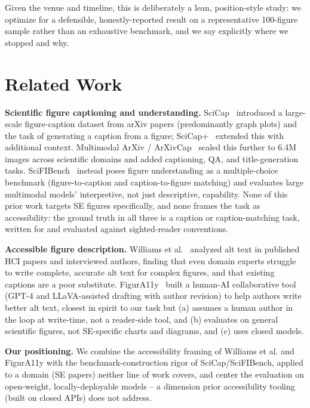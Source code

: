 \documentclass[10pt,conference]{IEEEtran}
\begin{document}
Given the venue and timeline, this is deliberately a lean, position-style study: we optimize for a defensible, honestly-reported result on a representative 100-figure sample rather than an exhaustive benchmark, and we say explicitly where we stopped and why.

\section{Related Work}
\label{sec:related}

\textbf{Scientific figure captioning and understanding.} SciCap~\cite{scicap} introduced a large-scale figure-caption dataset from arXiv papers (predominantly graph plots) and the task of generating a caption from a figure; SciCap+~\cite{scicapplus} extended this with additional context. Multimodal ArXiv / ArXivCap~\cite{arxivcap} scaled this further to 6.4M images across scientific domains and added captioning, QA, and title-generation tasks. SciFIBench~\cite{scifibench} instead poses figure understanding as a multiple-choice benchmark (figure-to-caption and caption-to-figure matching) and evaluates large multimodal models' interpretive, not just descriptive, capability. None of this prior work targets SE figures specifically, and none frames the task as accessibility: the ground truth in all three is a caption or caption-matching task, written for and evaluated against sighted-reader conventions.

\textbf{Accessible figure description.} Williams et al.~\cite{williams2022} analyzed alt text in published HCI papers and interviewed authors, finding that even domain experts struggle to write complete, accurate alt text for complex figures, and that existing captions are a poor substitute. FigurA11y~\cite{figura11y} built a human-AI collaborative tool (GPT-4 and LLaVA-assisted drafting with author revision) to help authors write better alt text, closest in spirit to our task but (a) assumes a human author in the loop at write-time, not a reader-side tool, and (b) evaluates on general scientific figures, not SE-specific charts and diagrams, and (c) uses closed models.

\textbf{Our positioning.} We combine the accessibility framing of Williams et al. and FigurA11y with the benchmark-construction rigor of SciCap/SciFIBench, applied to a domain (SE papers) neither line of work covers, and center the evaluation on open-weight, locally-deployable models -- a dimension prior accessibility tooling (built on closed APIs) does not address.
\end{document}
